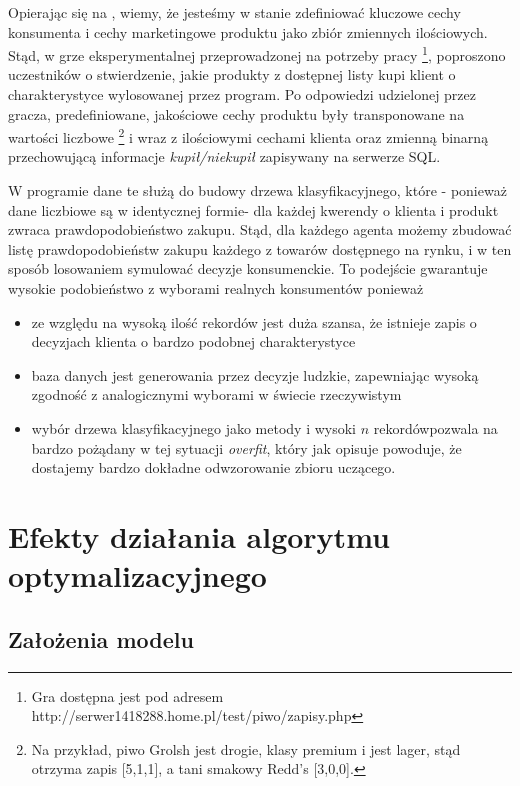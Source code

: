 \documentclass[polish, twoside, 12pt, a4paper]{article}
\theoremstyle{definition}
\theoremstyle{plain}
\theoremstyle{remark}
\begin{document}
Opierając się na \cite{Sagan2011}, wiemy, że jesteśmy w stanie zdefiniować kluczowe cechy konsumenta i cechy marketingowe produktu jako zbiór zmiennych ilościowych. Stąd, w grze eksperymentalnej przeprowadzonej na potrzeby pracy \footnote{Gra dostępna jest pod adresem http://serwer1418288.home.pl/test/piwo/zapisy.php}, poproszono uczestników o stwierdzenie, jakie produkty z dostępnej listy kupi klient o charakterystyce wylosowanej przez program. Po odpowiedzi udzielonej przez gracza, predefiniowane, jakościowe cechy produktu były transponowane na wartości liczbowe \footnote{Na przykład, piwo Grolsh jest drogie, klasy premium i jest lager, stąd otrzyma zapis [5,1,1], a tani smakowy Redd's [3,0,0].} i wraz z ilościowymi cechami klienta oraz zmienną binarną przechowującą informacje \textit{kupił/niekupił} zapisywany na serwerze SQL. 

W programie dane te służą do budowy drzewa klasyfikacyjnego, które - ponieważ dane liczbiowe są w identycznej formie- dla każdej kwerendy o klienta i produkt zwraca prawdopodobieństwo zakupu. Stąd, dla każdego agenta możemy zbudować listę prawdopodobieństw zakupu każdego z towarów dostępnego na rynku, i w ten sposób losowaniem symulować decyzje konsumenckie. To podejście gwarantuje wysokie podobieństwo z wyborami realnych konsumentów ponieważ

	\begin{itemize}
		\item ze względu na wysoką ilość rekordów jest duża szansa, że istnieje zapis o decyzjach klienta o bardzo podobnej charakterystyce
		\item baza danych jest generowania przez decyzje ludzkie, zapewniając wysoką zgodność z analogicznymi wyborami w świecie rzeczywistym
		\item wybór drzewa klasyfikacyjnego  jako metody i wysoki $n$ rekordówpozwala na bardzo pożądany w tej sytuacji \textit{overfit}, który jak opisuje \cite{James2013} powoduje, że dostajemy bardzo dokładne odwzorowanie zbioru uczącego. 
	\end{itemize}

\clearpage
\section{Efekty działania algorytmu optymalizacyjnego}

\subsection{Założenia modelu}
\end{document}
